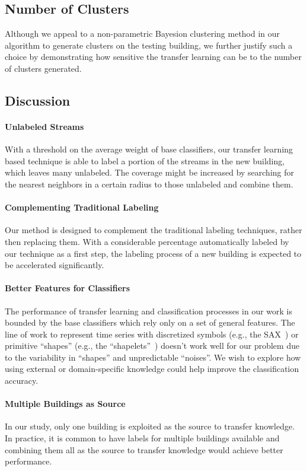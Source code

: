 \subsection{Number of Clusters}
Although we appeal to a non-parametric Bayesion clustering method in our algorithm to generate clusters on the testing building, we further justify such a choice by demonstrating how sensitive the transfer learning can be to the number of clusters generated.


\subsection{Discussion}
\paragraph{Unlabeled Streams}
With a threshold on the average weight of base classifiers, our transfer learning based technique is able to label a portion of the streams in the new building, which leaves many unlabeled.
The coverage might be increased by searching for the nearest neighbors in a certain radius to those unlabeled and combine them.

\paragraph{Complementing Traditional Labeling}
Our method is designed to complement the traditional labeling techniques, rather then replacing them.
With a considerable percentage automatically labeled by our technique as a first step, the labeling process of a new building is expected to be accelerated significantly.

\paragraph{Better Features for Classifiers} The performance of transfer learning and classification processes in our work is bounded by the base classifiers which rely only on a set of general features. The line of work to represent time series with discretized symbols (e.g., the SAX~\cite{sax}) or primitive ``shapes'' (e.g., the ``shapelets''~\cite{shapelet1, shapelet2}) doesn't work well for our problem due to the variability in ``shapes'' and unpredictable ``noises''. We wish to explore how using external or domain-specific knowledge could help improve the classification accuracy. 

\paragraph{Multiple Buildings as Source}
In our study, only one building is exploited as the source to transfer knowledge. In practice, it is common to have labels for multiple buildings available and combining them all as the source to transfer knowledge would  achieve better performance.